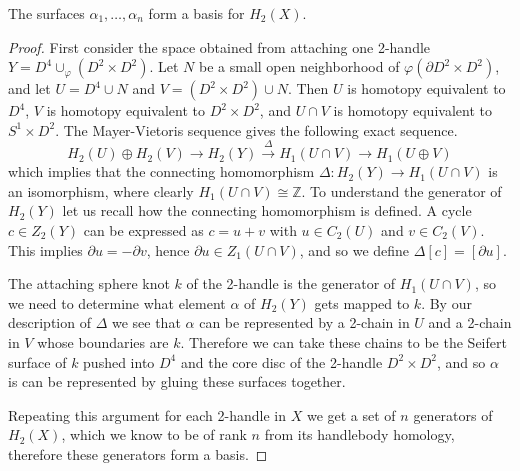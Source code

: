 \begin{prop}
The surfaces $\alpha_1,\ldots,\alpha_n$ form a basis for $H_2(X)$.
\end{prop}
\begin{proof}
First consider the space obtained from attaching one 2-handle $Y = D^4 \cup_{\varphi} (D^2 \times D^2)$. Let $N$ be a small open neighborhood of $\varphi(\partial D^2 \times D^2)$, and let $U = D^4 \cup N$ and $V = (D^2 \times D^2) \cup N$. Then $U$ is homotopy equivalent to $D^4$, $V$ is homotopy equivalent to $D^2 \times D^2$, and $U \cap V$ is homotopy equivalent to $S^1 \times D^2$. The Mayer-Vietoris sequence gives the following exact sequence.
\[ H_2(U) \oplus H_2(V) \longrightarrow H_2(Y) \stackrel{\Delta}{\longrightarrow} H_1(U \cap V) \longrightarrow H_1(U \oplus V) \]
which implies that the connecting homomorphism $\Delta : H_2(Y) \rightarrow H_1(U \cap V)$ is an isomorphism, where clearly $H_1(U \cap V) \cong \mathbb Z$. To understand the generator of $H_2(Y)$ let us recall how the connecting homomorphism is defined. A cycle $c \in Z_2(Y)$ can be expressed as $c = u+v$ with $u \in C_2(U)$ and $v \in C_2(V)$. This implies $\partial u = -\partial v$, hence $\partial u \in Z_1(U \cap V)$, and so we define $\Delta[c] = [\partial u]$. 

The attaching sphere knot $k$ of the 2-handle is the generator of $H_1(U \cap V)$, so we need to determine what element $\alpha$ of $H_2(Y)$ gets mapped to $k$. By our description of $\Delta$ we see that $\alpha$ can be represented by a 2-chain in $U$ and a 2-chain in $V$ whose boundaries are $k$. Therefore we can take these chains to be the Seifert surface of $k$ pushed into $D^4$ and the core disc of the 2-handle $D^2 \times D^2$, and so $\alpha$ is can be represented by gluing these surfaces together.

Repeating this argument for each 2-handle in $X$ we get a set of $n$ generators of $H_2(X)$, which we know to be of rank $n$ from its handlebody homology, therefore these generators form a basis.
\end{proof}

